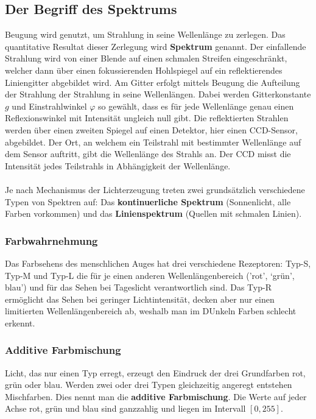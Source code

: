 \subsection{Der Begriff des Spektrums}
Beugung wird genutzt, um Strahlung in seine Wellenlänge zu zerlegen. Das quantitative Resultat dieser Zerlegung wird \textbf{Spektrum} genannt. Der einfallende Strahlung wird von einer Blende auf einen schmalen Streifen eingeschränkt, welcher dann über einen fokussierenden Hohlspiegel auf ein reflektierendes Liniengitter abgebildet wird. Am Gitter erfolgt mittels Beugung die Aufteilung der Strahlung der Strahlung in seine Wellenlängen. Dabei werden Gitterkonstante $g$ und Einstrahlwinkel $\varphi$ so gewählt, dass es für jede Wellenlänge genau einen Reflexionswinkel mit Intensität ungleich null gibt. Die reflektierten Strahlen werden über einen zweiten Spiegel auf einen Detektor, hier einen CCD-Sensor, abgebildet. Der Ort, an welchem ein Teilstrahl mit bestimmter Wellenlänge auf dem Sensor auftritt, gibt die Wellenlänge des Strahls an. Der CCD misst die Intensität jedes Teilstrahls in Abhängigkeit der Wellenlänge.
\\\\
Je nach Mechanismus der Lichterzeugung treten zwei grundsätzlich verschiedene Typen von Spektren auf: Das \textbf{kontinuerliche Spektrum} (Sonnenlicht, alle Farben vorkommen) und das \textbf{Linienspektrum} (Quellen mit schmalen Linien).
\subsubsection{Farbwahrnehmung}
Das Farbsehens des menschlichen Auges hat drei verschiedene Rezeptoren: Typ-S, Typ-M und Typ-L die für je einen anderen Wellenlängenbereich ('rot', `grün', blau') und für das Sehen bei Tageslicht verantwortlich sind. Das Typ-R ermöglicht das Sehen bei geringer Lichtintensität, decken aber nur einen limitierten Wellenlängenbereich ab, weshalb man im DUnkeln Farben schlecht erkennt.
\subsubsection{Additive Farbmischung}
Licht, das nur einen Typ erregt, erzeugt den Eindruck der drei Grundfarben rot, grün oder blau. Werden zwei oder drei Typen gleichzeitig angeregt entstehen Mischfarben. Dies nennt man die \textbf{additive Farbmischung}. Die Werte auf jeder Achse rot, grün und blau sind ganzzahlig und liegen im Intervall $[0, 255]$. 
